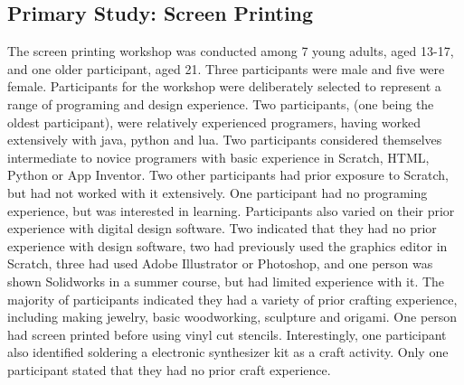 \documentclass{sigchi}
\begin{document}
\subsection{Primary Study: Screen Printing}
The screen printing workshop was conducted among 7 young adults, aged 13-17, and one older participant, aged 21. Three participants were male and five were female. Participants for the workshop were deliberately selected to represent a range of programing and design experience. Two participants, (one being the oldest participant), were relatively experienced programers, having worked extensively with java, python and lua. Two participants considered themselves intermediate to novice programers with basic experience in Scratch, HTML, Python or App Inventor. Two other participants had prior exposure to Scratch, but had not worked with it extensively. One participant had no programing experience, but was interested in learning. Participants also varied on their prior experience with digital design software. Two indicated that they had no prior experience with design software, two had previously used the graphics editor in Scratch, three had used Adobe Illustrator or Photoshop, and one person was shown Solidworks in a summer course, but had limited experience with it. The majority of participants indicated they had a variety of prior crafting experience, including making jewelry, basic woodworking, sculpture and origami. One person had screen printed before using vinyl cut stencils. Interestingly, one participant also identified soldering a electronic synthesizer kit as a craft activity. Only one participant stated that they had no prior craft experience.
\end{document}
